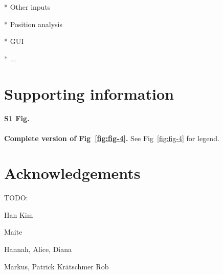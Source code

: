 \documentclass[10pt,letterpaper]{article}\usepackage[]{graphicx}\usepackage[]{color}
\begin{document}
* Other inputs 

* Position analysis

* GUI

* ... 


\section*{Supporting information}

\paragraph*{S1 Fig.}
\label{S1-Fig}
{\bf Complete version of Fig~\ref{fig:fig-4}.}
See Fig~\ref{fig:fig-4} for legend.


\section*{Acknowledgements}
TODO:

Han Kim

Maite

Hannah, Alice, Diana

Markus, Patrick Kr{\"a}tschmer Rob



\nolinenumbers

%
%
% 



{}


\end{document}
